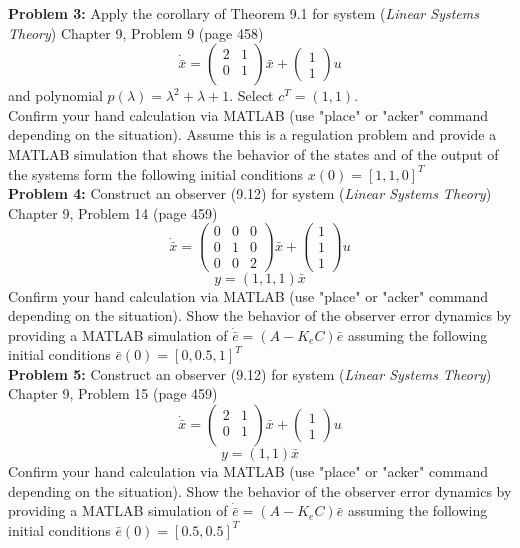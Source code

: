 \documentclass[12pt]{article}
\begin{document}
\noindent
\textbf{Problem 3:} Apply the corollary of Theorem 9.1 for system ({\em Linear Systems Theory}) Chapter 9, Problem 9 (page 458)
$$
\dot{\bar{x}}=
\begin{pmatrix}
	2 & 1 \\
	0 & 1 \\
\end{pmatrix}
\bar{x}+
\begin{pmatrix}
	1 \\
	1
\end{pmatrix} u
$$
and polynomial $p(\lambda)=\lambda^2+\lambda+1$. Select $c^T=(1, 1)$.\\
Confirm your hand calculation via MATLAB (use "place" or "acker" command depending on the situation). Assume this is a regulation problem and provide a MATLAB simulation that shows the behavior of the states and of the output of the systems form the following initial conditions $x(0)=[1,1,0]^T$\\

\noindent
\textbf{Problem 4:} Construct an observer (9.12) for system ({\em Linear Systems Theory}) Chapter 9, Problem 14 (page 459)
$$
\dot{\bar{x}}=
\begin{pmatrix}
	0 & 0 & 0 \\
	0 & 1 & 0 \\
	0 & 0 & 2
\end{pmatrix}
\bar{x}+
\begin{pmatrix}
	1 \\
	1 \\
	1
\end{pmatrix} u
$$
$$y=(1,1,1)\bar{x}$$
Confirm your hand calculation via MATLAB (use "place" or "acker" command depending on the situation). Show the behavior of the observer error dynamics by providing a MATLAB simulation of $\dot{\bar{e}}=(A-K_eC)\bar{e}$ assuming the following initial conditions $\bar{e}(0)=[0,0.5,1]^T$ \\

\noindent
\textbf{Problem 5:} Construct an observer (9.12) for system ({\em Linear Systems Theory}) Chapter 9, Problem 15 (page 459)
$$
\dot{\bar{x}}=
\begin{pmatrix}
	2 & 1 \\
	0 & 1 \\
\end{pmatrix}
\bar{x}+
\begin{pmatrix}
	1 \\
	1
\end{pmatrix} u
$$
$$y=(1,1)\bar{x}$$
Confirm your hand calculation via MATLAB (use "place" or "acker" command depending on the situation). Show the behavior of the observer error dynamics by providing a MATLAB simulation of $\dot{\bar{e}}=(A-K_eC)\bar{e}$ assuming the following initial conditions $\bar{e}(0)=[0.5, 0.5]^T$
\end{document}
